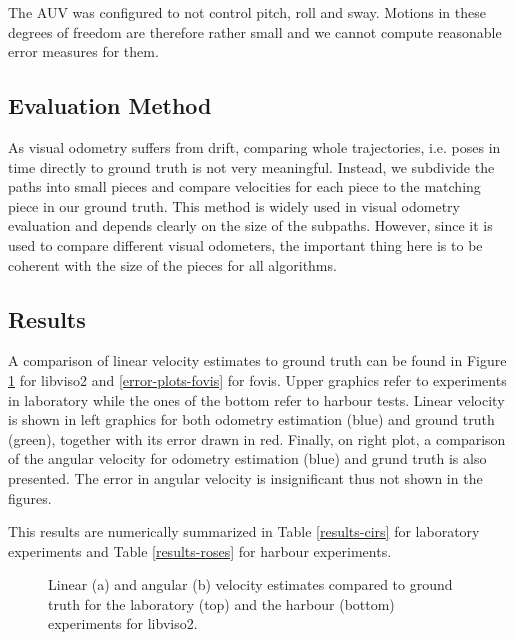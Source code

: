 \documentclass[conference]{IEEEtran}
\begin{document}
The AUV was configured to not control pitch, roll and sway. Motions in these degrees of freedom are therefore rather small and we cannot compute reasonable error measures for them.

\subsection{Evaluation Method
  \label{evaluation-method}
}

As visual odometry suffers from drift, comparing whole trajectories, i.e. poses in time directly to ground truth is not very meaningful. Instead, we subdivide the paths into small pieces and compare velocities for each piece to the matching piece in our ground truth. This method is widely used in visual odometry evaluation \cite{Kitti2013} and depends clearly on the size of the subpaths. However, since it is used to compare different visual odometers, the important thing here is to be coherent with the size of the pieces for all algorithms.

\subsection{Results
  \label{results}
}

A comparison of linear velocity estimates to ground truth can be found in Figure \ref{error-plots-viso2} for libviso2 and \ref{error-plots-fovis} for fovis. Upper graphics refer to experiments in laboratory while the ones of the bottom refer to harbour tests. Linear velocity is shown in left graphics for both odometry estimation (blue) and ground truth (green), together with its error drawn in red. Finally, on right plot, a comparison of the angular velocity for odometry estimation (blue) and grund truth is also presented. The error in angular velocity is insignificant thus not shown in the figures.

This results are numerically summarized in Table \ref{results-cirs} for laboratory experiments and Table \ref{results-roses} for harbour experiments.

\begin{figure}
  \begin{center}
  \end{center}
  \caption{Linear (a) and angular (b) velocity estimates compared to ground truth for the laboratory (top) and the harbour (bottom) experiments for libviso2.}
  \label{error-plots-viso2}
\end{figure}
\end{document}

